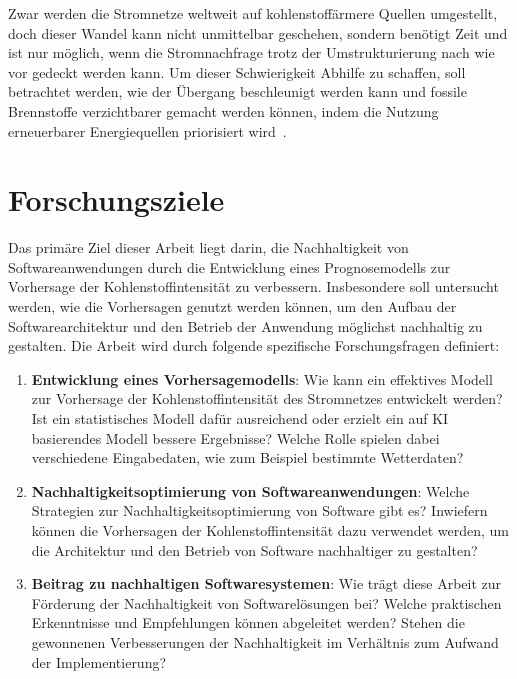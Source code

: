 Zwar werden die Stromnetze weltweit auf kohlenstoffärmere Quellen umgestellt, doch dieser Wandel kann nicht unmittelbar geschehen, sondern benötigt Zeit und ist nur möglich, wenn die Stromnachfrage trotz der Umstrukturierung nach wie vor gedeckt werden kann.
Um dieser Schwierigkeit Abhilfe zu schaffen, soll betrachtet werden, wie der Übergang beschleunigt werden kann und fossile Brennstoffe verzichtbarer gemacht werden können, indem die Nutzung erneuerbarer Energiequellen priorisiert wird~\cite{GreenSoftwareFoundation.2022}.

\section{Forschungsziele}\label{CAP:goals}
Das primäre Ziel dieser Arbeit liegt darin, die Nachhaltigkeit von Softwareanwendungen durch die Entwicklung eines Prognosemodells zur Vorhersage der Kohlenstoffintensität zu verbessern.
Insbesondere soll untersucht werden, wie die Vorhersagen genutzt werden können, um den Aufbau der Softwarearchitektur und den Betrieb der Anwendung möglichst nachhaltig zu gestalten.
Die Arbeit wird durch folgende spezifische Forschungsfragen definiert:

\begin{enumerate}
 \item \textbf{Entwicklung eines Vorhersagemodells}: Wie kann ein effektives Modell zur Vorhersage der Kohlenstoffintensität des Stromnetzes entwickelt werden?
 Ist ein statistisches Modell dafür ausreichend oder erzielt ein auf \ac{KI} basierendes Modell bessere Ergebnisse?
 Welche Rolle spielen dabei verschiedene Eingabedaten, wie zum Beispiel bestimmte Wetterdaten?
 \item \textbf{Nachhaltigkeitsoptimierung von Softwareanwendungen}: Welche Strategien zur Nachhaltigkeitsoptimierung von Software gibt es?
 Inwiefern können die Vorhersagen der Kohlenstoffintensität dazu verwendet werden, um die Architektur und den Betrieb von Software nachhaltiger zu gestalten?
 \item \textbf{Beitrag zu nachhaltigen Softwaresystemen}: Wie trägt diese Arbeit zur Förderung der Nachhaltigkeit von Softwarelösungen bei?
 Welche praktischen Erkenntnisse und Empfehlungen können abgeleitet werden?
 Stehen die gewonnenen Verbesserungen der Nachhaltigkeit im Verhältnis zum Aufwand der Implementierung?
\end{enumerate}

